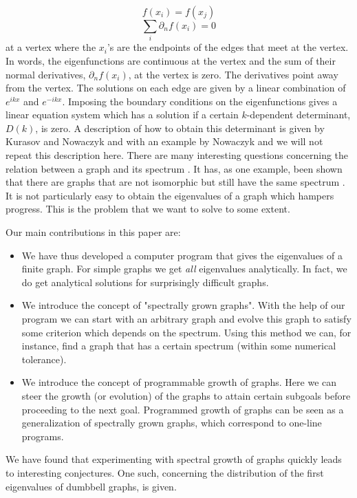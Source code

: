 \documentclass[a4paper]{article}
\begin{document}
\begin{equation}
f(x_i)=f(x_j)
\end{equation} 
\begin{equation}
\sum_{i}\partial_{n}f(x_i)=0
\end{equation}
at a vertex where the $x_i$'s are the endpoints of the edges that meet at the vertex. In words, the eigenfunctions are continuous at the vertex and the sum of their normal derivatives, $\partial_{n}f(x_i)$, at the vertex is zero. The derivatives point away from the vertex. The solutions on each edge are given by a linear combination of $e^{i k x}$ and $e^{-i k x}$. Imposing the boundary conditions on the eigenfunctions gives a linear equation system which has a solution if a certain $k$-dependent determinant, $D(k)$, is zero. A description of how to obtain this determinant is given by Kurasov and Nowaczyk \cite{kurasov2005inverse} and with an example by Nowaczyk \cite{nowaczyk2005inverse} and we will not repeat this description here. There are many interesting questions concerning the relation between a graph and its spectrum \cite{kennedy2015spectral, berkolaiko2013introduction}. It has, as one example, been shown that there are graphs that are not isomorphic but still have the same spectrum \cite{gutkin2001can}.  It is not particularly easy to obtain the eigenvalues of a graph which hampers progress. This is the problem that we want to solve to some extent. 

Our main contributions in this paper are:
\begin{itemize}
\item We have thus developed a computer program that gives the eigenvalues of a finite graph. For simple graphs we get \emph{all} eigenvalues analytically. In fact, we do get analytical solutions for surprisingly difficult graphs.
\item We introduce the concept of "spectrally grown graphs". With the help of our program we can start with an arbitrary graph and evolve this graph to satisfy some criterion which depends on the spectrum. Using this method we can, for instance, find a graph that has a certain spectrum (within some numerical tolerance).
\item We introduce the concept of programmable growth of graphs. Here we can steer the growth (or evolution) of the graphs to attain certain subgoals before proceeding to the next goal. Programmed growth of graphs can be seen as a generalization of spectrally grown graphs, which correspond to one-line programs. 
\end{itemize}
We have found that experimenting with spectral growth of graphs quickly leads to interesting conjectures. One such, concerning the distribution of the first eigenvalues of dumbbell graphs, is given. 
\end{document}

